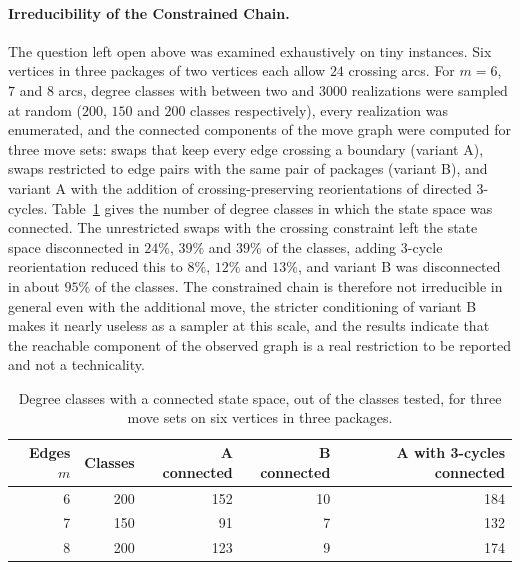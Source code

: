 \documentclass[11pt]{article}
\begin{document}
\paragraph{Irreducibility of the Constrained Chain.} The question left open above was examined exhaustively on tiny instances. Six vertices in three packages of two vertices each allow $24$ crossing arcs. For $m=6$, $7$ and $8$ arcs, degree classes with between two and $3000$ realizations were sampled at random ($200$, $150$ and $200$ classes respectively), every realization was enumerated, and the connected components of the move graph were computed for three move sets: swaps that keep every edge crossing a boundary (variant A), swaps restricted to edge pairs with the same pair of packages (variant B), and variant A with the addition of crossing-preserving reorientations of directed 3-cycles. Table~\ref{tab:irreducible} gives the number of degree classes in which the state space was connected. The unrestricted swaps with the crossing constraint left the state space disconnected in $24\%$, $39\%$ and $39\%$ of the classes, adding 3-cycle reorientation reduced this to $8\%$, $12\%$ and $13\%$, and variant B was disconnected in about $95\%$ of the classes. The constrained chain is therefore not irreducible in general even with the additional move, the stricter conditioning of variant B makes it nearly useless as a sampler at this scale, and the results indicate that the reachable component of the observed graph is a real restriction to be reported and not a technicality.

\begin{table}[h]
\centering
\begin{tabular}{rrrrr}
\hline
Edges $m$ & Classes & A connected & B connected & A with 3-cycles connected \\
\hline
6 & 200 & 152 & 10 & 184 \\
7 & 150 & 91 & 7 & 132 \\
8 & 200 & 123 & 9 & 174 \\
\hline
\end{tabular}
\caption{Degree classes with a connected state space, out of the classes tested, for three move sets on six vertices in three packages.}
\label{tab:irreducible}
\end{table}
\end{document}
